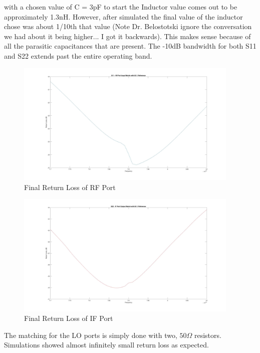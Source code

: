 \documentclass{article}                                                         %
\begin{document}
with a chosen value of C = 3pF to start the Inductor value comes out to be approximately 1.3nH. However, after simulated the final value of
the inductor chose was about 1/10th that value (Note Dr. Belostotski ignore the conversation we had about it being higher... I got it backwards). This
makes sense because of all the parasitic capacitances that are present. The -10dB bandwidth for both S11 and S22 extends past the entire operating band.
\begin{figure}[H]
  \centering
  \includegraphics[width=0.95\textwidth] {Plots/S11.jpg}
  \caption{Final Return Loss of RF Port}
    \label{fig:matS11}
\end{figure}
\begin{figure}[H]
  \centering
  \includegraphics[width=0.95\textwidth] {Plots/S22.jpg}
  \caption{Final Return Loss of IF Port}
    \label{fig:matS22}
\end{figure}

The matching for the LO ports is simply done with two, $50 \Omega$ resistors. Simulations
showed almost infinitely small return loss as expected.
\end{document}

